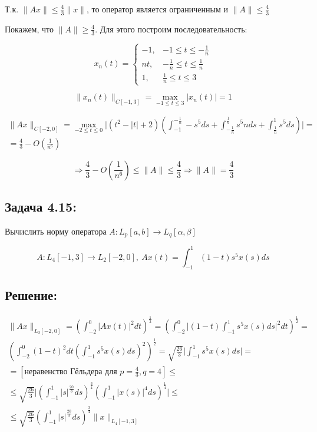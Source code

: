 \documentclass[12pt, a4paper]{report}
\begin{document}
Т.к. $\| A x\| \le \frac{4}{3}\|x\|$, то оператор является ограниченным и 
$\| A \| \le \frac{4}{3}$ 

Покажем, что $\| A \| \ge \frac{4}{3}$. Для этого построим последовательность:

\begin{equation*}
    x_n(t) = 
\begin{cases}
    - 1, & - 1 \le t \le - \frac{1}{n}\\
    nt, & - \frac{1}{n} \le t \le \frac{1}{n} \\
    1, & \frac{1}{n} \le t \le 3
\end{cases}
\end{equation*}

\[\| x_n(t) \|_{C[ - 1, 3]} = \max_{ - 1 \le t \le 3} | x_n(t)| = 1\]

\begin{multline*}
    \| Ax \|_{C[ - 2, 0]} =
     \max_{ - 2 \le t \le 0} \Big| (t^2 - |t| + 2) 
    \left( \int_{ - 1}^{ - \frac{1}{n}} - s^5 ds + \int_{ - \frac{1}{n}}^{\frac{1}{n}} s^5 nds +
    \int_{\frac{1}{n}}^{1} s^5 ds \right) \Big| =\\=
    \frac{4}{3} - O(\frac{1}{n^6})
\end{multline*}

\[ \Rightarrow \frac{4}{3} - O(\frac{1}{n^6}) \le \| A \| \le \frac{4}{3} \Rightarrow
\| A \| = \frac{4}{3} \]

\subsection*{Задача 4.15:}

Вычислить норму оператора $A: L_p[a, b] \to L_q[\alpha, \beta]$

\[A: L_4[-1, 3] \to L_2[-2, 0],\ Ax(t)=\int_{-1}^{1}(1 - t)s^5x(s)ds\]

\subsection*{Решение:}

\begin{multline*}
\| A x \|_{L_2[-2, 0]} = \left( \int_{-2}^{0} \Big| Ax(t) \Big|^2 dt \right)^{\frac{1}{2}} =
\left( \int_{ - 2}^{0} \Big| (1 - t) \int_{ - 1}^{1} s^5 x(s) ds \Big|^2 dt \right)^\frac{1}{2} =\\
\left( \int_{ - 2}^{0} (1 - t)^2 dt \left( \int_{ - 1}^{1} s^5 x(s) ds \right)^2 \right)^\frac{1}{2} =
\sqrt{\frac{26}{3}} \Big| \int_{ - 1}^{1} s^5 x(s) ds \Big| =\\=
 \left[\text{неравенство Гёльдера для } p = \frac{4}{3}, q = 4\right] \le \\ \le
 \sqrt{\frac{26}{3}} \Big| \left( \int_{ - 1}^{1} \Big| s \Big|^\frac{20}{3} ds \right)^\frac{3}{4} 
 \left( \int_{ - 1}^{1} \Big| x(s) \Big|^4 ds \right)^\frac{1}{4} \Big| \le \\ \le
 \sqrt{\frac{26}{3}} \left( \int_{ - 1}^{1} |s|^\frac{20}{3} ds \right)^\frac{3}{4} \| x \|_{L_4[ - 1, 3]}
\end{multline*}
\end{document}
